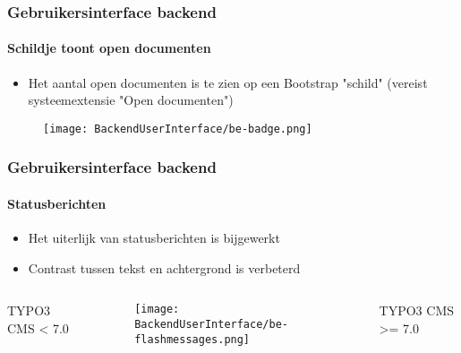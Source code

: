 \begin{frame}[fragile]
	\frametitle{Gebruikersinterface backend}
	\framesubtitle{Schildje toont open documenten}

	\begin{itemize}
		\item Het aantal open documenten is te zien op een Bootstrap "schild"\newline
			(vereist systeemextensie "Open documenten")
	\end{itemize}
	\begin{figure}
		\texttt{[image: BackendUserInterface/be-badge.png]}
	\end{figure}

\end{frame}


\begin{frame}[fragile]
	\frametitle{Gebruikersinterface backend}
	\framesubtitle{Statusberichten}

	\begin{itemize}
		\item Het uiterlijk van statusberichten is bijgewerkt
		\item Contrast tussen tekst en achtergrond is verbeterd
	\end{itemize}

	\begin{columns}[T]
		\begin{column}{.25\textwidth}
			\smaller\hfill 
				\begingroup\color{typo3red}TYPO3 CMS < 7.0\endgroup
			\normalsize
		\end{column}

		\begin{column}{.5\textwidth}
			\begin{figure}\vspace*{-0.6cm}
				\texttt{[image: BackendUserInterface/be-flashmessages.png]}
			\end{figure}
		\end{column}

		\begin{column}{.25\textwidth}
			\smaller
				\begingroup\color{typo3red}TYPO3 CMS >= 7.0\endgroup
			\normalsize
		\end{column}

	\end{columns}

\end{frame}

